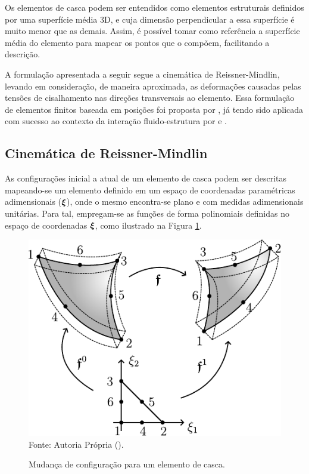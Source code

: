 Os elementos de casca podem ser entendidos como elementos estruturais definidos por uma superfície média 3D, e cuja dimensão perpendicular a essa superfície é muito menor que as demais. Assim, é possível tomar como referência a superfície média do elemento para mapear os pontos que o compõem, facilitando a descrição.

A formulação apresentada a seguir segue a cinemática de Reissner-Mindlin, levando em consideração, de maneira aproximada, as deformações causadas pelas tensões de cisalhamento nas direções transversais ao elemento. Essa formulação de elementos finitos baseada em posições foi proposta por , já tendo sido aplicada com sucesso ao contexto da interação fluido-estrutura por  e .

\subsection{Cinemática de Reissner-Mindlin}

As configurações inicial a atual de um elemento de casca podem ser descritas mapeando-se um elemento definido em um espaço de coordenadas paramétricas adimensionais ($\boldsymbol{\xi}$), onde o mesmo encontra-se plano e com medidas adimensionais unitárias. Para tal, empregam-se as funções de forma polinomiais definidas no espaço de coordenadas $\boldsymbol{\xi}$, como ilustrado na Figura \ref{fig:Mapeamento}.

\begin{figure}[h!]
    \centering
    \caption{Mudança de configuração para um elemento de casca.}
    \includegraphics[width=.4\linewidth]{Figuras/Mapeamento.pdf}
    \\Fonte: Autoria Própria (\the\year).
    \label{fig:Mapeamento}
\end{figure}

